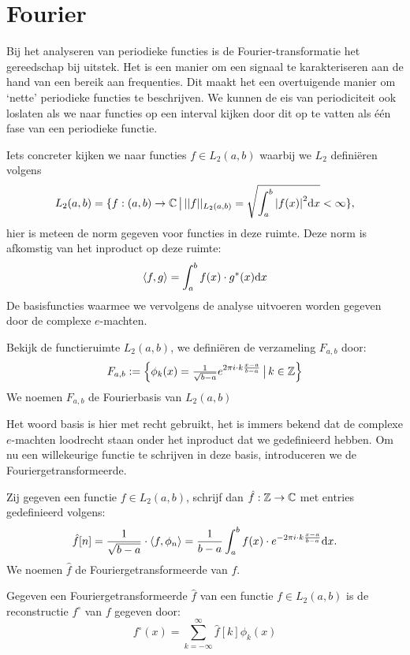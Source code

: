 \chapter{Fourier}

Bij het analyseren van periodieke functies is de Fourier-transformatie het gereedschap bij uitstek.
Het is een manier om een signaal te karakteriseren aan de hand van een bereik aan frequenties.
Dit maakt het een overtuigende manier om `nette' periodieke functies te beschrijven.
We kunnen de eis van periodiciteit ook loslaten als we naar functies op een interval kijken door dit op te vatten
als \'e\'en fase van een periodieke functie.

Iets concreter kijken we naar functies $f\in L_2(a,b)$ waarbij we $L_2$ defini\"eren volgens
\[
L_2(a,b) = \{ f:(a,b)\to\mathbb{C} \,\big|\, {||f||_{L_2(a,b)}} = \sqrt{\int_a^b {\left| f(x) \right|}^2 {\mathrm{d} x}} < \infty \},
\]
hier is meteen de norm gegeven voor functies in deze ruimte. Deze norm is afkomstig van het inproduct op deze ruimte:
\[
\langle f , g \rangle = \int_a^b f(x)\cdot g^*(x) {\mathrm{d} x}
\]
De basisfuncties waarmee we vervolgens de analyse uitvoeren worden gegeven door de complexe $e$-machten.
\begin{definitie}[Fourierbasis] Bekijk de functieruimte $L_2(a,b)$, we defini\"eren de verzameling $F_{a,b}$ 
door:
\[
  F_{a,b} := \left\{ \phi_k(x) = \tfrac{1}{\sqrt{b-a}} e^{{2\pi i} \cdot k \frac{x-a}{b-a}} \,\big|\, k \in \mathbb{Z} \right\}
\]
We noemen $F_{a,b}$ de Fourierbasis van $L_2(a,b)$
\end{definitie}
Het woord basis is hier met recht gebruikt, het is immers bekend dat de complexe $e$-machten loodrecht staan onder
het inproduct dat we gedefinieerd hebben. Om nu een willekeurige functie te schrijven in deze basis, introduceren
we de Fouriergetransformeerde.
\begin{definitie}[Fouriergetransformeerde]
Zij gegeven een functie $f\in L_2(a,b)$, schrijf dan $\hat f : \mathbb{Z}\to\mathbb{C}$ met entries gedefinieerd volgens:
\[
  \hat f [n] = \frac{1}{\sqrt{b-a}} \cdot \langle f , \phi_n \rangle = \frac{1}{b-a} \int_a^b f(x) \cdot e^{-2 \pi i \cdot k \frac{x-a}{b-a}}{\mathrm{d} x}.
\]
We noemen $\hat f$ de Fouriergetransformeerde van $f$.
\end{definitie}
\begin{definitie}
  Gegeven een Fouriergetransformeerde $\hat f$ van een functie $f \in L_2(a,b)$ is de reconstructie $f^\circ$ van $f$ gegeven door:
  \[
    f^\circ (x) = \sum_{k=-\infty}^\infty \hat f [k] \phi_k(x)
  \]
\end{definitie}

